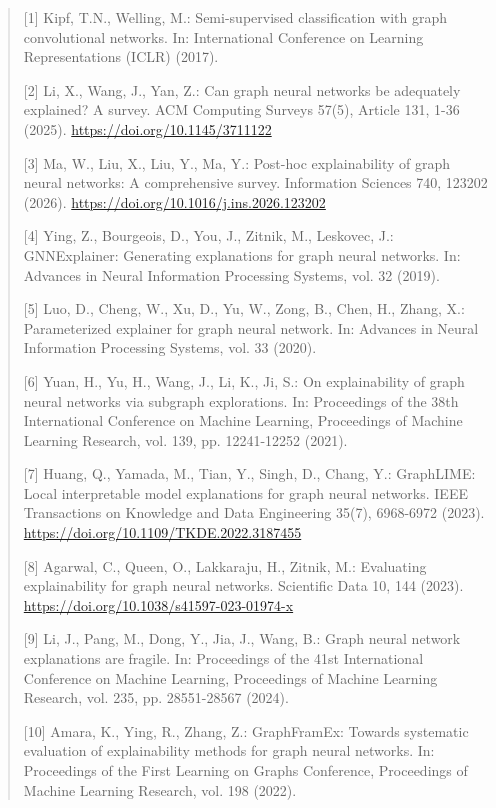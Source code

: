 \documentclass[a4paper]{article}
\begin{document}
\begin{quote}
{[}1{]} Kipf, T.N., Welling, M.: Semi-supervised classification with
graph convolutional networks. In: International Conference on Learning
Representations (ICLR) (2017).

{[}2{]} Li, X., Wang, J., Yan, Z.: Can graph neural networks be
adequately explained? A survey. ACM Computing Surveys 57(5), Article
131, 1-36 (2025). \url{https://doi.org/10.1145/3711122}

{[}3{]} Ma, W., Liu, X., Liu, Y., Ma, Y.: Post-hoc explainability of
graph neural networks: A comprehensive survey. Information Sciences 740,
123202 (2026). \url{https://doi.org/10.1016/j.ins.2026.123202}

{[}4{]} Ying, Z., Bourgeois, D., You, J., Zitnik, M., Leskovec, J.:
GNNExplainer: Generating explanations for graph neural networks. In:
Advances in Neural Information Processing Systems, vol. 32 (2019).

{[}5{]} Luo, D., Cheng, W., Xu, D., Yu, W., Zong, B., Chen, H., Zhang,
X.: Parameterized explainer for graph neural network. In: Advances in
Neural Information Processing Systems, vol. 33 (2020).

{[}6{]} Yuan, H., Yu, H., Wang, J., Li, K., Ji, S.: On explainability of
graph neural networks via subgraph explorations. In: Proceedings of the
38th International Conference on Machine Learning, Proceedings of
Machine Learning Research, vol. 139, pp. 12241-12252 (2021).

{[}7{]} Huang, Q., Yamada, M., Tian, Y., Singh, D., Chang, Y.:
GraphLIME: Local interpretable model explanations for graph neural
networks. IEEE Transactions on Knowledge and Data Engineering 35(7),
6968-6972 (2023). \url{https://doi.org/10.1109/TKDE.2022.3187455}

{[}8{]} Agarwal, C., Queen, O., Lakkaraju, H., Zitnik, M.: Evaluating
explainability for graph neural networks. Scientific Data 10, 144
(2023). \url{https://doi.org/10.1038/s41597-023-01974-x}

{[}9{]} Li, J., Pang, M., Dong, Y., Jia, J., Wang, B.: Graph neural
network explanations are fragile. In: Proceedings of the 41st
International Conference on Machine Learning, Proceedings of Machine
Learning Research, vol. 235, pp. 28551-28567 (2024).

{[}10{]} Amara, K., Ying, R., Zhang, Z.: GraphFramEx: Towards systematic
evaluation of explainability methods for graph neural networks. In:
Proceedings of the First Learning on Graphs Conference, Proceedings of
Machine Learning Research, vol. 198 (2022).


\end{quote}
\end{document}

